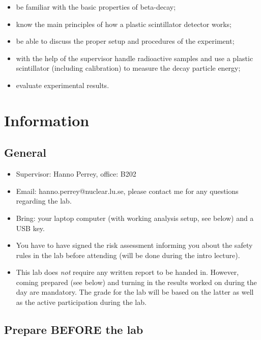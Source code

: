 \documentclass[a4,11pt, notitlepage]{article}
\begin{document}
\begin{itemize}
\item be familiar with the basic properties of beta-decay;
\item know the main principles of how a plastic scintillator detector works;
\item be able to discuss the proper setup and procedures of the experiment;
\item with the help of the supervisor handle radioactive samples and use a
  plastic scintillator (including calibration) to measure the decay particle energy;
\item evaluate experimental results.
\end{itemize}

\section{Information}


\subsection{General}

\begin{itemize}
\item Supervisor: Hanno Perrey, office: B202
\item Email: hanno.perrey@nuclear.lu.se, please contact me for any questions regarding the lab. 
\item Bring: your laptop computer (with working
  analysis setup, see below) and a USB key. 
\item You have to have signed the risk assessment informing you about the safety
  rules in the lab before attending (will be done during the intro lecture).
\item This lab does \emph{not} require any written report to be handed in.
  However, coming prepared (see below) and turning in the results worked on
  during the day are mandatory. The grade for the lab will be based on the
  latter as well as the active participation during the lab.
\end{itemize}



\subsection{Prepare BEFORE the lab}
\end{document}
